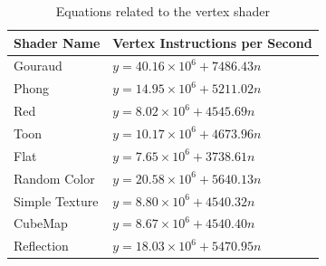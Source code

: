 \documentclass[10pt, conference, compsocconf]{IEEEtran}
\begin{document}
\begin{table}[!t]
\centering
\caption{Equations related to the vertex shader}
\begin{tabular}{ll}
	\hline
	\textbf{Shader Name} & \textbf{Vertex Instructions per Second} \\
	\hline
	Gouraud & $y = 40.16 \times 10^6 + 7486.43n$  \\
	Phong &  $y = 14.95 \times 10^6 + 5211.02n$  \\
	Red & $y = 8.02 \times 10^6 + 4545.69n$ \\
	Toon & $y = 10.17 \times 10^6 + 4673.96n$ \\
	Flat & $y = 7.65 \times 10^6 + 3738.61n$ \\
	Random Color & $y = 20.58 \times 10^6 + 5640.13n$ \\
	Simple Texture & $y = 8.80 \times 10^6 + 4540.32n$ \\
	CubeMap & $y = 8.67 \times 10^6 + 4540.40n$ \\
	Reflection & $y = 18.03 \times 10^6 + 5470.95n$ \\
	\hline
\end{tabular}
\label{equation_nexus_vertex}
\end{table}
\end{document}
